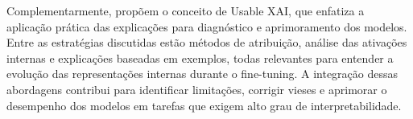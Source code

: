 Complementarmente, \cite{wu2025usablexai10strategies} propõem o conceito de Usable XAI, que enfatiza a aplicação prática das explicações para diagnóstico e aprimoramento dos modelos. Entre as estratégias discutidas estão métodos de atribuição, análise das ativações internas e explicações baseadas em exemplos, todas relevantes para entender a evolução das representações internas durante o fine-tuning. A integração dessas abordagens contribui para identificar limitações, corrigir vieses e aprimorar o desempenho dos modelos em tarefas que exigem alto grau de interpretabilidade.